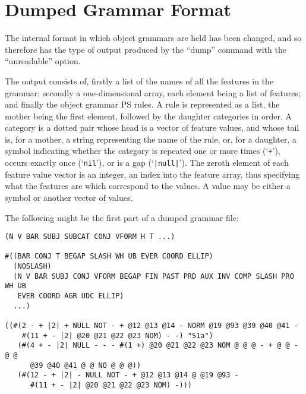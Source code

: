 \section*{Dumped Grammar Format}

The internal format in which object grammars are held has been changed,
and so therefore has the type of output produced by the ``dump'' command
with the ``unreadable'' option.

The output consists of, firstly a list of the names of all the features in
the grammar; secondly a one-dimensional array, each element being
a list of features; and finally the object grammar PS rules.
A rule is represented as a list, the mother
being the first element, followed by the daughter categories in order.
A category is a dotted pair whose head is a vector of feature values,
and whose tail is, for a mother, a string representing the name
of the rule, or, for a daughter, a symbol indicating whether the
category is repeated one or more times (`{\tt +}'), occurs
exactly once (`{\tt nil}'), or is a gap (`{\tt |null|}').
The zeroth element of each feature value vector is an integer, an
index into the feature array, thus specifying what the features are
which correspond to the values. A value may be either a symbol or
another vector of values.

The following might be the first part of a dumped grammar file:
{\small
\begin{ex}
\begin{verbatim}
(N V BAR SUBJ SUBCAT CONJ VFORM H T ...)

#((BAR CONJ T BEGAP SLASH WH UB EVER COORD ELLIP)
  (NOSLASH) 
  (N V BAR SUBJ CONJ VFORM BEGAP FIN PAST PRD AUX INV COMP SLASH PRO WH UB
   EVER COORD AGR UDC ELLIP)
  ...)

((#(2 - + |2| + NULL NOT - + @12 @13 @14 - NORM @19 @93 @39 @40 @41 - 
    #(11 + - |2| @20 @21 @22 @23 NOM) - -) "S1a")
   (#(4 + - |2| NULL - - - #(1 +) @20 @21 @22 @23 NOM @ @ @ - + @ @ - @ @
      @39 @40 @41 @ @ NO @ @ @))
   (#(12 - + |2| - NULL NOT - + @12 @13 @14 @ @19 @93 - 
      #(11 + - |2| @20 @21 @22 @23 NOM) -)))
\end{verbatim}
\end{ex}
}

